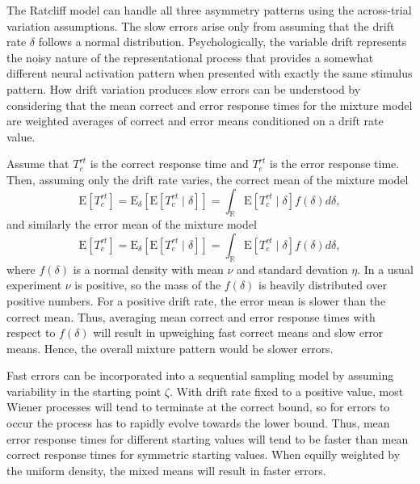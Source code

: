 \documentclass[12pt]{article}
\begin{document}
The Ratcliff model can handle all three asymmetry patterns using the across-trial variation assumptions. The slow errors arise only from assuming that the drift rate $\delta$ follows a normal distribution. Psychologically, the variable drift represents the noisy nature of the representational process that provides a somewhat different neural activation pattern when presented with exactly the same stimulus pattern. How drift variation produces slow errors can be understood by considering that the mean correct and error response times for the mixture model are weighted averages of correct and error means conditioned on a drift rate value. 

Assume that $T_c^{rt}$ is the correct response time and $T_e^{rt}$ is the error response time. Then, assuming only the drift rate varies, the correct mean of the mixture model
\begin{equation}
\mathrm{E}\left[T_c^{rt}\right] = \mathrm{E}_\delta\left[\mathrm{E}\left[T_c^{rt} \mid \delta\right]\right] = \int_\mathbb{R}\mathrm{E}\left[T_c^{rt} \mid \delta\right] f(\delta)d\delta,
\end{equation}
and similarly the error mean of the mixture model
\begin{equation}
\mathrm{E}\left[T_e^{rt}\right] = \mathrm{E}_\delta\left[\mathrm{E}\left[T_e^{rt} \mid \delta\right]\right] = \int_\mathbb{R}\mathrm{E}\left[T_e^{rt} \mid \delta\right] f(\delta)d\delta,
\end{equation}
where $f(\delta)$ is a normal density with mean $\nu$ and standard devation $\eta$. In a usual experiment $\nu$ is positive, so the mass of the $f(\delta)$ is heavily distributed over positive numbers. For a positive drift rate, the error mean is slower than the correct mean.  Thus, averaging mean correct and error response times with respect to $f(\delta)$ will result in upweighing fast correct means and slow error means. Hence, the overall mixture pattern would be slower errors.

Fast errors can be incorporated into a sequential sampling model by assuming variability in the starting point $\zeta$. With drift rate fixed to a positive value, most Wiener processes will tend to terminate at the correct bound, so for errors to occur the process has to rapidly evolve towards the lower bound. Thus, mean error response times for different starting values will tend to be faster than mean correct response times for symmetric starting values. When equilly weighted by the uniform density, the mixed means will result in faster errors.
\end{document}
